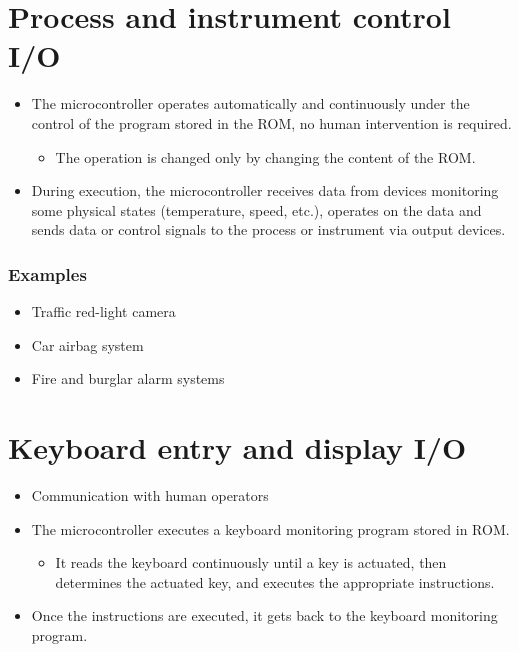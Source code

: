 \documentclass[11pt]{article}
\begin{document}
\section{Process and instrument control I/O}
\label{sec:orgf0984e1}
\begin{itemize}
\item The microcontroller operates automatically and continuously under the control of the program stored in the ROM, no human intervention is required.
\begin{itemize}
\item The operation is changed only by changing the content of the ROM.
\end{itemize}
\item During execution, the microcontroller receives data from devices monitoring some physical states (temperature, speed, etc.), operates on the data and sends data or control signals to the process or instrument via output devices.
\end{itemize}

\subsubsection{Examples}
\label{sec:orgbae13e0}
\begin{itemize}
\item Traffic red-light camera
\item Car airbag system
\item Fire and burglar alarm systems
\end{itemize}

 \newpage

\section{Keyboard entry and display I/O}
\label{sec:org0f92e64}
\begin{itemize}
\item Communication with human operators
\item The microcontroller executes a keyboard monitoring program stored in ROM.
\begin{itemize}
\item It reads the keyboard continuously until a key is actuated, then determines the actuated key, and executes the appropriate instructions.
\end{itemize}
\item Once the instructions are executed, it gets back to the keyboard monitoring program.
\end{itemize}
\end{document}
